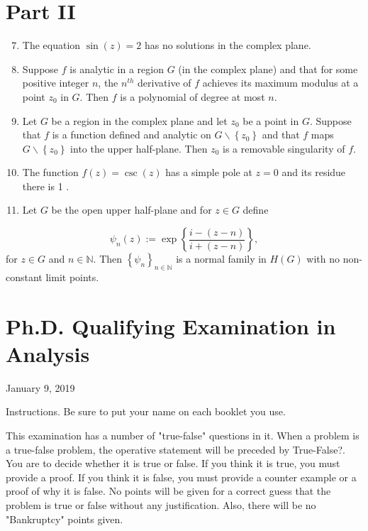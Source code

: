 \documentclass[10pt]{article}
\begin{document}
\section{Part II}
\begin{enumerate}
  \setcounter{enumi}{6}
  \item The equation $\sin (z)=2$ has no solutions in the complex plane.

  \item Suppose $f$ is analytic in a region $G$ (in the complex plane) and that for some positive integer $n$, the $n^{t h}$ derivative of $f$ achieves its maximum modulus at a point $z_{0}$ in $G$. Then $f$ is a polynomial of degree at most $n$.

  \item Let $G$ be a region in the complex plane and let $z_{0}$ be a point in $G$. Suppose that $f$ is a function defined and analytic on $G \backslash\left\{z_{0}\right\}$ and that $f$ maps $G \backslash\left\{z_{0}\right\}$ into the upper half-plane. Then $z_{0}$ is a removable singularity of $f$.

  \item The function $f(z)=\csc (z)$ has a simple pole at $z=0$ and its residue there is 1 .

  \item Let $G$ be the open upper half-plane and for $z \in G$ define

\end{enumerate}
$$
\psi_{n}(z):=\exp \left\{\frac{i-(z-n)}{i+(z-n)}\right\},
$$
for $z \in G$ and $n \in \mathbb{N}$. Then $\left\{\psi_{n}\right\}_{n \in \mathbb{N}}$ is a normal family in $H(G)$ with no non-constant limit points.

\section{Ph.D. Qualifying Examination in Analysis}
January 9, 2019

Instructions. Be sure to put your name on each booklet you use.

This examination has a number of "true-false" questions in it. When a problem is a true-false problem, the operative statement will be preceded by True-False?. You are to decide whether it is true or false. If you think it is true, you must provide a proof. If you think it is false, you must provide a counter example or a proof of why it is false. No points will be given for a correct guess that the problem is true or false without any justification. Also, there will be no "Bankruptcy" points given.
\end{document}
